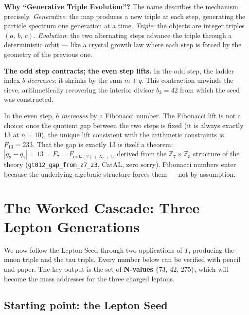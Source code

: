 \documentclass[11pt,a4paper]{article}
\newcommand{\term}[1]{\textbf{#1}}
\newcommand{\lean}[1]{\texttt{#1}}
\newcommand{\Nc}{N_c}
\newcommand{\CatAL}{\textsf{CatAL}}
\begin{document}
\medskip
\noindent\textbf{Why ``Generative Triple Evolution''?}\enspace
The name describes the mechanism precisely.  \emph{Generative}: the map produces a
new triple at each step, generating the particle spectrum one generation at a time.
\emph{Triple}: the objects are integer triples $(a,\,b,\,c)$.
\emph{Evolution}: the two alternating steps advance the triple through a deterministic
orbit --- like a crystal growth law where each step is forced by the geometry of the
previous one.

\medskip
\noindent\textbf{The odd step contracts; the even step lifts.}\enspace
In the odd step, the ladder index $b$ \emph{decreases}: it shrinks by the sum $m+q$.
This contraction unwinds the sieve, arithmetically recovering the interior divisor
$b_2 = 42$ from which the seed was constructed.

In the even step, $b$ \emph{increases} by a Fibonacci number.  The Fibonacci lift
is not a choice: once the quotient gap between the two steps is fixed (it is always
exactly 13 at $n = 10$), the unique lift consistent with the arithmetic constraints
is $F_{13} = 233$.  That the gap is exactly 13 is itself a theorem:
$|q_2 - q_1| = 13 = F_7 = F_{\mathrm{ord}_7(2) + \Nc + 1}$, derived from
the $\mathbb{Z}_7 \times \mathbb{Z}_3$ structure of the theory
(\lean{gt012\_gap\_from\_z7\_z3}, \CatAL, zero sorry).  Fibonacci numbers enter
because the underlying algebraic structure forces them — not by assumption.

\section{The Worked Cascade: Three Lepton Generations}
\label{sec:cascade}

\begin{tcolorbox}[colback=boxblue,colframe=blue!40!black,title=Orientation]
We now follow the Lepton Seed through two applications of $T$, producing the muon
triple and the tau triple.  Every number below can be verified with pencil and paper.
The key output is the set of \term{N-values} $\{73,\,42,\,275\}$, which will become
the mass addresses for the three charged leptons.
\end{tcolorbox}

\subsection{Starting point: the Lepton Seed}
\end{document}
